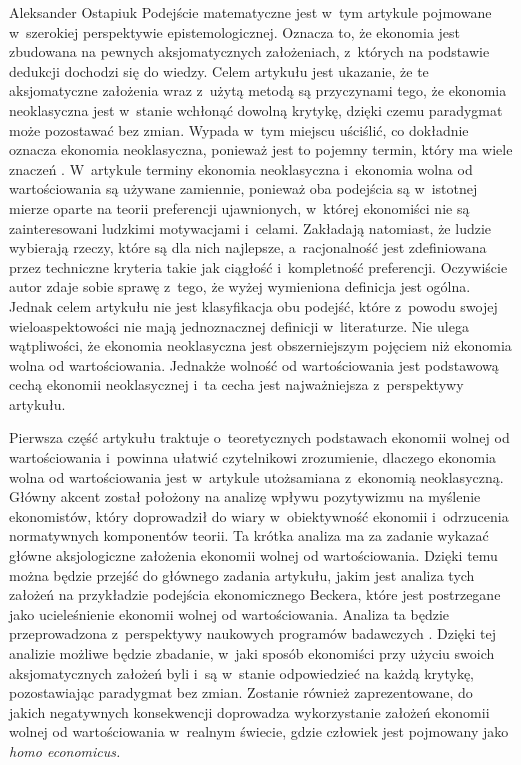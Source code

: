 \begin{artplenv}{Aleksander Ostapiuk}
Podejście matematyczne jest w~tym artykule pojmowane w~szerokiej perspektywie epistemologicznej. Oznacza to, że ekonomia
jest zbudowana na pewnych aksjomatycznych założeniach, z~których na podstawie dedukcji dochodzi się do wiedzy. Celem
artykułu jest ukazanie, że te aksjomatyczne założenia wraz z~użytą metodą są przyczynami tego, że ekonomia neoklasyczna
jest w~stanie wchłonąć dowolną krytykę, dzięki czemu paradygmat może pozostawać bez zmian. Wypada w~tym miejscu
uściślić, co dokładnie oznacza ekonomia neoklasyczna, ponieważ jest to pojemny termin, który ma wiele znaczeń
\parencite{colander_death_2000}.
W~artykule terminy ekonomia neoklasyczna i~ekonomia wolna od wartościowania
są używane zamiennie, ponieważ oba podejścia są w~istotnej mierze oparte na teorii preferencji ujawnionych, w~której
ekonomiści nie są zainteresowani ludzkimi motywacjami i~celami. Zakładają natomiast, że ludzie wybierają rzeczy, które
są dla nich najlepsze, a~racjonalność jest zdefiniowana przez techniczne kryteria takie jak ciągłość i~kompletność
preferencji. Oczywiście autor zdaje sobie sprawę z~tego, że wyżej wymieniona definicja jest ogólna. Jednak celem
artykułu nie jest klasyfikacja obu podejść, które z~powodu swojej wieloaspektowości nie mają jednoznacznej
definicji w~literaturze. Nie ulega wątpliwości, że ekonomia neoklasyczna jest obszerniejszym pojęciem niż ekonomia wolna od
wartościowania. Jednakże wolność od wartościowania jest podstawową cechą ekonomii neoklasycznej
\parencite{sen_rational_1977,putnam_end_2011,hausman_etyka_2017}
i~ta cecha jest
najważniejsza z~perspektywy artykułu. 

Pierwsza część artykułu traktuje o~teoretycznych podstawach ekonomii wolnej od wartościowania i~powinna ułatwić
czytelnikowi zrozumienie, dlaczego ekonomia wolna od wartościowania jest w~artykule utożsamiana z~ekonomią
neoklasyczną. Główny akcent został położony na analizę wpływu pozytywizmu na myślenie ekonomistów, który doprowadził do
wiary w~obiektywność ekonomii i~odrzucenia normatywnych komponentów teorii. Ta krótka analiza ma za zadanie wykazać
główne aksjologiczne założenia ekonomii wolnej od wartościowania. Dzięki temu można będzie przejść do głównego zadania
artykułu, jakim jest analiza tych założeń na przykładzie podejścia ekonomicznego Beckera, które jest
postrzegane jako ucieleśnienie ekonomii wolnej od wartościowania. Analiza ta będzie
przeprowadzona z~perspektywy naukowych programów badawczych
\parencite{lakatos_methodology_1980,lakatos_pisma_1995}.
Dzięki tej analizie możliwe
będzie zbadanie, w~jaki sposób ekonomiści przy użyciu swoich aksjomatycznych założeń byli i~są w~stanie odpowiedzieć na
każdą krytykę, pozostawiając paradygmat bez zmian. Zostanie również zaprezentowane, do jakich negatywnych konsekwencji
doprowadza wykorzystanie założeń ekonomii wolnej od wartościowania w~realnym świecie, gdzie człowiek jest pojmowany
jako \textit{homo economicus.} 


\end{artplenv}
